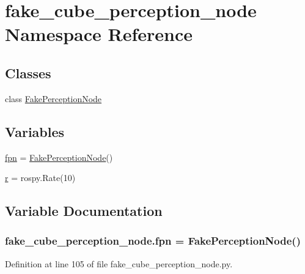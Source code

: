 \hypertarget{namespacefake__cube__perception__node}{}\section{fake\+\_\+cube\+\_\+perception\+\_\+node Namespace Reference}
\label{namespacefake__cube__perception__node}
\subsection*{Classes}
\begin{DoxyCompactItemize}
\item 
class \hyperlink{classfake__cube__perception__node_1_1FakePerceptionNode}{Fake\+Perception\+Node}
\end{DoxyCompactItemize}
\subsection*{Variables}
\begin{DoxyCompactItemize}
\item 
\hyperlink{namespacefake__cube__perception__node_a884c359a5cfb68aa706a9a0506d1ae2c}{fpn} = \hyperlink{classfake__cube__perception__node_1_1FakePerceptionNode}{Fake\+Perception\+Node}()
\item 
\hyperlink{namespacefake__cube__perception__node_a36e88703ab69fd35065e8a8d9344903e}{r} = rospy.\+Rate(10)
\end{DoxyCompactItemize}


\subsection{Variable Documentation}
\subsubsection[{\texorpdfstring{fpn}{fpn}}]{\setlength{\rightskip}{0pt plus 5cm}fake\+\_\+cube\+\_\+perception\+\_\+node.\+fpn = {\bf Fake\+Perception\+Node}()}\hypertarget{namespacefake__cube__perception__node_a884c359a5cfb68aa706a9a0506d1ae2c}{}\label{namespacefake__cube__perception__node_a884c359a5cfb68aa706a9a0506d1ae2c}


Definition at line 105 of file fake\+\_\+cube\+\_\+perception\+\_\+node.\+py.

